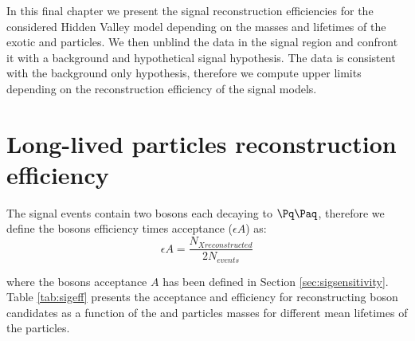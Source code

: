 In this final chapter we present the signal reconstruction efficiencies for the considered
 Hidden Valley
model depending on the masses and lifetimes of the exotic \Higgs and \X particles. 
We then unblind the data in the signal region and confront it with a background and hypothetical
 signal hypothesis. The data is consistent with the background only hypothesis, therefore we
compute upper limits depending on the reconstruction efficiency of the signal models.

\section{Long-lived particles reconstruction efficiency}
\label{sec:signalefficiency}

The signal events contain two \X bosons each decaying to $\qq$, therefore we define the \X bosons 
 efficiency times acceptance ($\epsilon A$) as:
\begin{equation}
\epsilon A= \frac{N_{X reconstructed}}{2N_{events}}
\end{equation}

where the \X bosons acceptance $A$ has been defined in Section \ref{sec:sigsensitivity}. 
Table \ref{tab:sigeff} presents the acceptance and efficiency for
reconstructing \X boson candidates as a function of the \Higgs and \X particles masses for different 
mean lifetimes of the \X particles.


